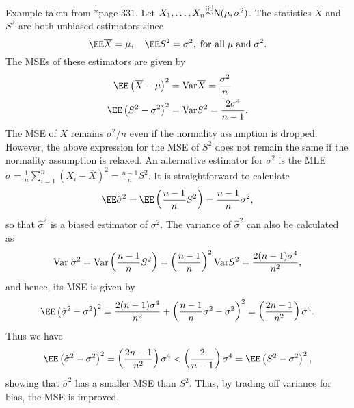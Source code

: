 \begin{exam} \label{exam: norm_mse_p1}
    Example taken from \cite{CasellaGeorge2001SI}*{page 331}. Let $X_1 , \ldots , X_n {\overset{\text{iid}}{\sim}} {\sf N} (\mu , \sigma^2)$. The statistics $\overline{X}$ and $S^2$ are both unbiased estimators since
    \begin{equation*}
        \EE \overline{X} = \mu, \quad \EE S^2 = \sigma^2, \; \text{for all} \; \mu \; \text{and} \; \sigma^2.
    \end{equation*}
    The MSEs of these estimators are given by
    \begin{align*}
        \EE \left( \overline{X} - \mu \right)^2 & = \Var \overline{X} = \frac{\sigma^2}{n} \\
        \EE \left( S^2 - \sigma^2 \right)^2     & = \Var S^2 = \frac{2 \sigma^4}{n - 1}.
    \end{align*}
    The MSE of $\overline{X}$ remains $\sigma^2 / n$ even if the normality assumption is dropped. However, the above expression for the MSE of $S^2$ does not remain the same if the normality assumption is relaxed. An alternative estimator for $\sigma^2$ is the MLE $\hat{\sigma} = \frac{1}{n} \sum_{i=1}^{n} \left( X_i - \overline{X} \right)^2 = \frac{n-1}{n} S^2$. It is straightforward to calculate
    \begin{equation*}
        \EE \hat{\sigma}^2 = \EE \left( \frac{n-1}{n} S^2 \right) = \frac{n-1}{n} \sigma^2,
    \end{equation*}
    so that $\hat{\sigma}^2$ is a biased estimator of $\sigma^2$. The variance of $\hat{\sigma}^2$ can also be calculated as
    \begin{equation*}
        {\operatorname{Var}} \; \hat{\sigma}^2 = {\operatorname{Var}} \left( \frac{n-1}{n} S^2 \right) = \left( \frac{n-1}{n} \right)^2 {\operatorname{Var}} S^2 = \frac{2(n-1) \sigma^4}{n^2},
    \end{equation*}
    and hence, its MSE is given by
    \begin{equation*}
        \EE \left( \hat{\sigma}^2 - \sigma^2 \right)^2 = \frac{2(n-1)\sigma^4}{n^2} + \left( \frac{n-1}{n} \sigma^2 - \sigma^2 \right)^2 = \left( \frac{2n-1}{n^2} \right) \sigma^4.
    \end{equation*}
    Thus we have
    \begin{equation*}
        \EE \left( \hat{\sigma}^2 - \sigma^2 \right)^2 = \left( \frac{2n-1}{n^2} \right) \sigma^4  < \left( \frac{2}{n-1} \right) \sigma^4 = \EE \left( S^2 - \sigma^2 \right)^2,
    \end{equation*}
    showing that $\hat{\sigma}^2$ has a smaller MSE than $S^2$. Thus, by trading off variance for bias, the MSE is improved.
\end{exam}

